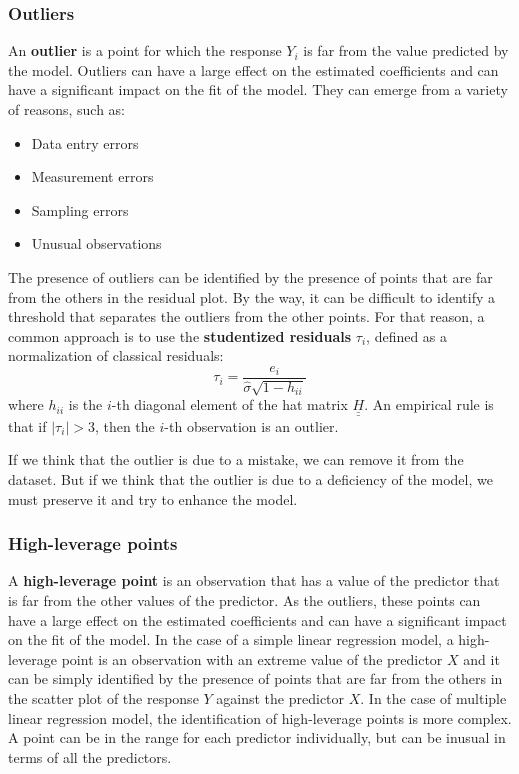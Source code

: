\subsubsection*{Outliers}
An \textbf{outlier} is a point for which the response $Y_i$ is far from the value predicted by the model. Outliers can have a large effect on the estimated coefficients and can have a significant impact on the fit of the model.
They can emerge from a variety of reasons, such as:
\begin{itemize}
    \item Data entry errors
    \item Measurement errors
    \item Sampling errors
    \item Unusual observations
\end{itemize}
The presence of outliers can be identified by the presence of points that are far from the others in the residual plot. By the way, it can be difficult to identify a threshold that separates the outliers from the other points. For that reason, a common approach is to use the \textbf{studentized residuals} $\tau_i$, defined as a normalization of classical residuals:
\[
    \tau_i = \frac{e_i}{\hat{\sigma}\sqrt{1-h_{ii}}}
\]
where $h_{ii}$ is the $i$-th diagonal element of the hat matrix $\underline {\underline H}$. An empirical rule is that if $|\tau_i| > 3$, then the $i$-th observation is an outlier.

If we think that the outlier is due to a mistake, we can remove it from the dataset. But if we think that the outlier is due to a deficiency of the model, we must preserve it and try to enhance the model.
\subsubsection*{High-leverage points}
A \textbf{high-leverage point} is an observation that has a value of the predictor that is far from the other values of the predictor. As the outliers, these points can have a large effect on the estimated coefficients and can have a significant impact on the fit of the model.
In the case of a simple linear regression model, a high-leverage point is an observation with an extreme value of the predictor $X$ and it can be simply identified by the presence of points that are far from the others in the scatter plot of the response $Y$ against the predictor $X$.
In the case of multiple linear regression model, the identification of high-leverage points is more complex. A point can be in the range for each predictor individually, but can be inusual in terms of all the predictors. 

